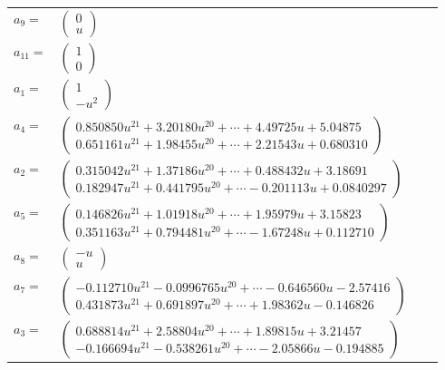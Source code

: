 \documentclass[1p]{elsarticle_modified}
\theoremstyle{definition}
\begin{document}
\begin{tabular}{m{7pt} m{180pt} m{7pt} m{180pt} }
\flushright $a_{9}=$&$\begin{pmatrix}0\\u\end{pmatrix}$ \\
\flushright $a_{11}=$&$\begin{pmatrix}1\\0\end{pmatrix}$ \\
\flushright $a_{1}=$&$\begin{pmatrix}1\\- u^2\end{pmatrix}$ \\
\flushright $a_{4}=$&$\begin{pmatrix}0.850850 u^{21}+3.20180 u^{20}+\cdots+4.49725 u+5.04875\\0.651161 u^{21}+1.98455 u^{20}+\cdots+2.21543 u+0.680310\end{pmatrix}$ \\
\flushright $a_{2}=$&$\begin{pmatrix}0.315042 u^{21}+1.37186 u^{20}+\cdots+0.488432 u+3.18691\\0.182947 u^{21}+0.441795 u^{20}+\cdots-0.201113 u+0.0840297\end{pmatrix}$ \\
\flushright $a_{5}=$&$\begin{pmatrix}0.146826 u^{21}+1.01918 u^{20}+\cdots+1.95979 u+3.15823\\0.351163 u^{21}+0.794481 u^{20}+\cdots-1.67248 u+0.112710\end{pmatrix}$ \\
\flushright $a_{8}=$&$\begin{pmatrix}- u\\u\end{pmatrix}$ \\
\flushright $a_{7}=$&$\begin{pmatrix}-0.112710 u^{21}-0.0996765 u^{20}+\cdots-0.646560 u-2.57416\\0.431873 u^{21}+0.691897 u^{20}+\cdots+1.98362 u-0.146826\end{pmatrix}$ \\
\flushright $a_{3}=$&$\begin{pmatrix}0.688814 u^{21}+2.58804 u^{20}+\cdots+1.89815 u+3.21457\\-0.166694 u^{21}-0.538261 u^{20}+\cdots-2.05866 u-0.194885\end{pmatrix}$ \\

\end{tabular}
\end{document}
